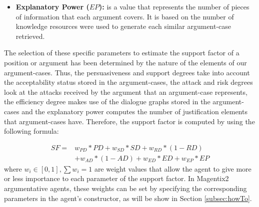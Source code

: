 \begin{itemize}
 \item\textbf{Explanatory Power ($EP$):} is a value that represents the number of pieces of information that each argument covers. It is based on the number of knowledge resources were used to generate each similar argument-case retrieved. %
\end{itemize}

The selection of these specific parameters to estimate the support factor of a position or argument has been determined by the nature of the elements of our argument-cases. Thus, the persuasiveness and support degrees take into account the acceptability status stored in the argument-cases, the attack and risk degrees look at the attacks received by the argument that an argument-case represents, the efficiency degree makes use of the dialogue graphs stored in the argument-cases and the explanatory power computes the number of justification elements that argument-cases have. Therefore, the support factor is computed by using the following formula:

\begin{equation}
 \begin{aligned}
 SF = & w_{PD} * PD + w_{SD} * SD + w_{RD} * (1-RD)\\
 & + w_{AD} * (1-AD) + w_{ED} * ED + w_{EP} * EP
 \end{aligned}
 \label{eq:sf}
\end{equation}
where $w_i \in [0, 1], \sum w_i = 1$ are weight values that allow the agent to give more or less importance to each parameter of the support factor. In Magentix2 argumentative agents, these weights can be set by specifying the corresponding parameters in the agent's constructor, as will be show in Section \ref{subsec:howTo}.

